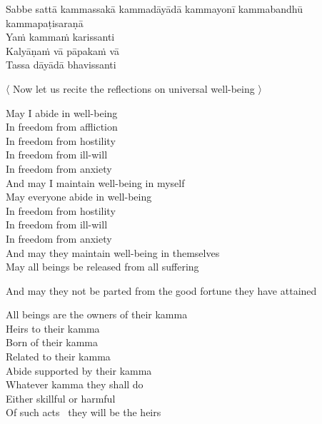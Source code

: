 Sabbe sattā kammassakā kammadāyādā kammayonī kammabandhū kammapaṭisaraṇā\\
Yaṁ kammaṁ karissanti\\
Kalyāṇaṁ vā pāpakaṁ vā\\
Tassa dāyādā bhavissanti

\clearpage

\begin{leader-english}
  〈 Now let us recite the reflections on universal well-being 〉
\end{leader-english}

\begin{english-verses}
  May I abide in well-being\\
  In freedom from affliction\\
  In freedom from hostility\\
  In freedom from ill-will\\
  In freedom from anxiety\\
  And may I maintain well-being in myself\\
  May everyone abide in well-being\\
  In freedom from hostility\\
  In freedom from ill-will\\
  In freedom from anxiety\\
  And may they maintain well-being in themselves\\
  May all beings be released from all suffering\\
\end{english-verses}
\begin{english-hang}
  And may they not be parted from the good fortune they have attained
\end{english-hang}
\begin{english-verses}
  All beings are the owners of their kamma\\
  Heirs to their kamma\\
  Born of their kamma\\
  Related to their kamma\\
  Abide supported by their kamma\\
  Whatever kamma they shall do\\
  Either skillful or harmful\\
  Of such acts \breathmark\ they will be the heirs\\
\end{english-verses}

